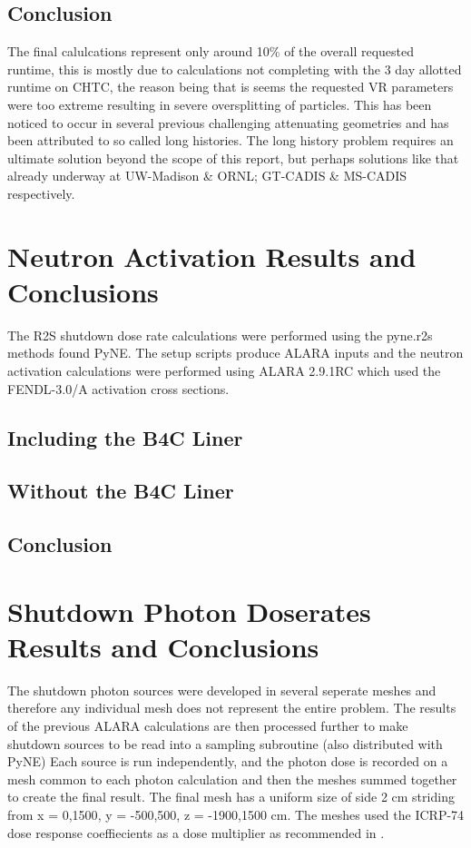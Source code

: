 \documentclass[12pt]{article}
\begin{document}
\subsection{Conclusion}
The final calulcations represent only around 10\% of the overall requested
runtime, this is mostly due to calculations not completing with the 3 day
allotted runtime on CHTC, the reason being that is seems the requested VR
parameters were too extreme resulting in severe oversplitting of particles.
This has been noticed to occur in several previous challenging attenuating
geometries and has been attributed to so called long histories. The long history
problem requires an ultimate solution beyond the scope of this report, but
perhaps solutions like that already underway at UW-Madison \& ORNL; GT-CADIS
\& MS-CADIS respectively.
\newpage
\clearpage

\section{Neutron Activation Results and Conclusions}
The R2S shutdown dose rate calculations were performed using the pyne.r2s
methods found PyNE. The setup scripts produce ALARA inputs and the neutron
activation calculations were performed using ALARA 2.9.1RC which used the
FENDL-3.0/A activation cross sections. 
\subsection{Including the B4C Liner}
\subsection{Without the B4C Liner}
\subsection{Conclusion}
\newpage
\section{Shutdown Photon Doserates Results and Conclusions}
The shutdown photon sources were developed in several seperate meshes and
therefore any individual mesh does not represent the entire problem. The
results of the previous ALARA calculations are then processed further to make
shutdown sources to be read into a sampling subroutine (also distributed with
PyNE) Each source is run independently, and the photon dose is recorded on a
mesh common to each photon calculation and then the meshes summed together to
create the final result. The final mesh has a uniform size of side 2 cm striding
from x = {0,1500}, y = {-500,500}, z = {-1900,1500} cm. The meshes used the
ICRP-74 dose response coeffiecients as a dose multiplier as recommended in
\cite{iter_sdr_coeffs}.
\end{document}
